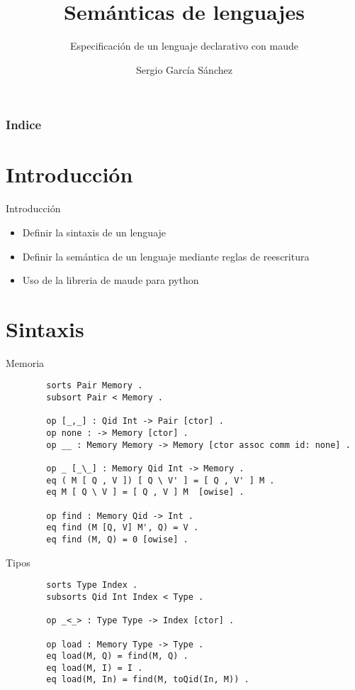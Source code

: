 \documentclass{beamer}
\title{Semánticas de lenguajes}
\subtitle{Especificación de un lenguaje declarativo con maude}
\author{Sergio García Sánchez}
\institute{UCM}
\date{\mydate}
\begin{document}
    \begin{frame}
        \titlepage
    \end{frame}

    \begin{frame}
        \frametitle{Indice}
        \tableofcontents
    \end{frame}


    \section{Introducción}
    \begin{frame}{Introducción}
        \begin{itemize}
            \item Definir la sintaxis de un lenguaje
            \item Definir la semántica de un lenguaje mediante reglas de reescritura
            \item Uso de la libreria de maude para python
        \end{itemize}
    \end{frame}

    \section{Sintaxis}
    \begin{frame}[fragile]{Memoria}
        \begin{verbatim}
        sorts Pair Memory .
        subsort Pair < Memory .
    
        op [_,_] : Qid Int -> Pair [ctor] .
        op none : -> Memory [ctor] .
        op __ : Memory Memory -> Memory [ctor assoc comm id: none] .

        op _ [_\_] : Memory Qid Int -> Memory .
        eq ( M [ Q , V ]) [ Q \ V' ] = [ Q , V' ] M .
        eq M [ Q \ V ] = [ Q , V ] M  [owise] .
        
        op find : Memory Qid -> Int .
        eq find (M [Q, V] M', Q) = V .
        eq find (M, Q) = 0 [owise] .
        \end{verbatim}
    \end{frame}

    \begin{frame}[fragile]{Tipos}
        \begin{verbatim}
        sorts Type Index .
        subsorts Qid Int Index < Type .

        op _<_> : Type Type -> Index [ctor] .

        op load : Memory Type -> Type .
        eq load(M, Q) = find(M, Q) .
        eq load(M, I) = I .
        eq load(M, In) = find(M, toQid(In, M)) .
        \end{verbatim}
    \end{frame}
\end{document}
